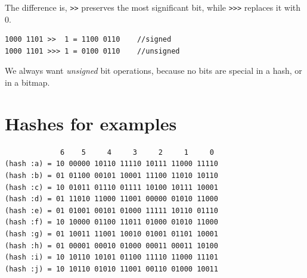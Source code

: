 \documentclass[preprint]{sigplanconf}
\begin{document}
The difference is, \texttt{>>} preserves the most significant
bit, while \texttt{>>>} replaces it with 0.
%
\begin{verbatim}
1000 1101 >>  1 = 1100 0110    //signed
1000 1101 >>> 1 = 0100 0110    //unsigned
\end{verbatim}
%
We always want \textit{unsigned} bit operations, because no bits
are special in a hash, or in a bitmap.

\section{Hashes for examples}
\label{hash-examples}

\begin{verbatim}
             6    5     4     3     2     1     0
(hash :a) = 10 00000 10110 11110 10111 11000 11110
(hash :b) = 01 01100 00101 10001 11100 11010 10110
(hash :c) = 10 01011 01110 01111 10100 10111 10001
(hash :d) = 01 11010 11000 11001 00000 01010 11000
(hash :e) = 01 01001 00101 01000 11111 10110 01110
(hash :f) = 10 10000 01100 11011 01000 01010 11000
(hash :g) = 01 10011 11001 10010 01001 01101 10001
(hash :h) = 01 00001 00010 01000 00011 00011 10100
(hash :i) = 10 10110 10101 01100 11110 11000 11101
(hash :j) = 10 10110 01010 11001 00110 01000 10011
\end{verbatim}
\end{document}
